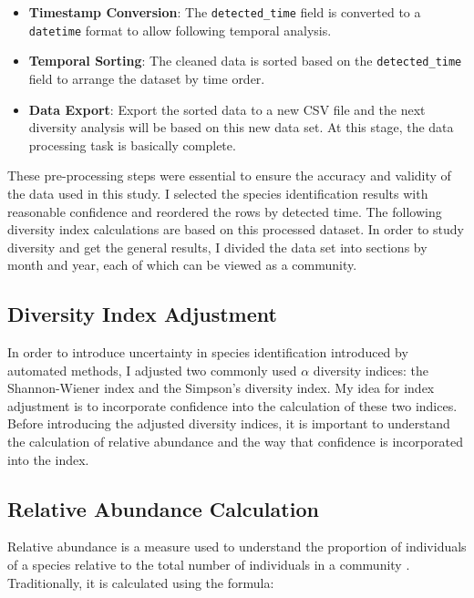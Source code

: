 \documentclass[a4paper,12pt]{article}
\begin{document}
\begin{itemize}
    \item \textbf{Timestamp Conversion}: The \texttt{detected\_time} field is converted to a \texttt{datetime} format to allow following temporal analysis.

    \item \textbf{Temporal Sorting}: The cleaned data is sorted based on the \texttt{detected\_time} field to arrange the dataset by time order.

    \item \textbf{Data Export}: Export the sorted data to a new CSV file and the next diversity analysis will be based on this new data set. At this stage, the data processing task is basically complete.
\end{itemize}

These pre-processing steps were essential to ensure the accuracy and validity of the data used in this study. I selected the species identification results with reasonable confidence and reordered the rows by detected time. The following diversity index calculations are based on this processed dataset. In order to study diversity and get the general results, I divided the data set into sections by month and year, each of which can be viewed as a community.



\subsection{Diversity Index Adjustment}
In order to introduce uncertainty in species identification introduced by automated methods, I adjusted two commonly used $\alpha$ diversity indices: the Shannon-Wiener index and the Simpson's diversity index. My idea for index adjustment is to incorporate confidence into the calculation of these two indices. Before introducing the adjusted diversity indices, it is important to understand the calculation of relative abundance and the way that confidence is incorporated into the index.

\subsection{Relative Abundance Calculation}
Relative abundance is a measure used to understand the proportion of individuals of a species relative to the total number of individuals in a community \citep{hubbell2011unified}. Traditionally, it is calculated using the formula:
\end{document}

